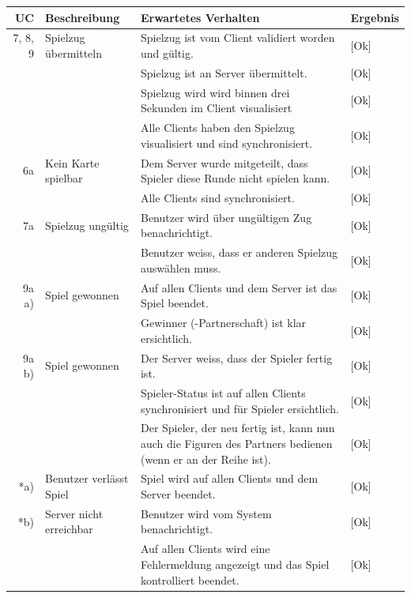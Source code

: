 \documentclass[12pt,halfparskip]{scrartcl}
\begin{document}
	\begin {tabular}{r | p{3cm} | p{8cm} | l}
		\toprule
		\textbf{UC} & \textbf{Beschreibung} & \textbf{Erwartetes Verhalten} & \textbf{Ergebnis} \\
		\midrule
		7, 8, 9 & Spielzug übermitteln & Spielzug ist vom Client validiert worden und gültig. & [Ok] \\
		 \cline{3-4} & & Spielzug ist an Server übermittelt. & [Ok] \\
		 \cline{3-4} & & Spielzug wird wird binnen drei Sekunden im Client visualisiert & [Ok] \\
		 \cline{3-4} & & Alle Clients haben den Spielzug visualisiert und sind synchronisiert. & [Ok] \\
		\midrule
		6a & Kein Karte spielbar & Dem Server wurde mitgeteilt, dass Spieler diese Runde nicht spielen kann. & [Ok] \\
		 \cline{3-4} & & Alle Clients sind synchronisiert. & [Ok] \\
		\midrule
		7a & Spielzug ungültig & Benutzer wird über ungültigen Zug benachrichtigt. & [Ok] \\
		 \cline{3-4} & & Benutzer weiss, dass er anderen Spielzug auswählen muss. & [Ok] \\
		\midrule
		9a a) & Spiel gewonnen & Auf allen Clients und dem Server ist das Spiel beendet. & [Ok] \\
		 \cline{3-4} & & Gewinner (-Partnerschaft) ist klar ersichtlich. & [Ok] \\
		\midrule
		9a b) & Spiel gewonnen & Der Server weiss, dass der Spieler fertig ist. & [Ok] \\
		 \cline{3-4} & & Spieler-Status ist auf allen Clients synchronisiert und für Spieler ersichtlich. & [Ok] \\
		 \cline{3-4} & & Der Spieler, der neu fertig ist, kann nun auch die Figuren des Partners bedienen (wenn er an der Reihe ist). & [Ok] \\
		\midrule
		*a) & Benutzer verlässt Spiel & Spiel wird auf allen Clients und dem Server beendet. & [Ok] \\
		\midrule
		*b) & Server nicht erreichbar & Benutzer wird vom System benachrichtigt. & [Ok] \\
		 \cline{3-4} & & Auf allen Clients wird eine Fehlermeldung angezeigt und das Spiel kontrolliert beendet. & [Ok] \\
		\bottomrule
	\end{tabular}
	
\end{document}
